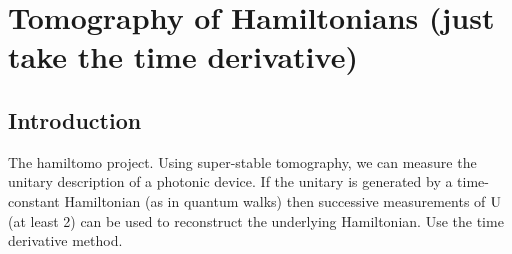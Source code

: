 \chapter{Tomography of Hamiltonians (just take the time derivative)}
\label{ch:Hamiltomo}

\section{Introduction}
The hamiltomo project. Using super-stable tomography, we can measure the unitary
description of a photonic device. If the unitary is generated by a time-constant
Hamiltonian (as in quantum walks) then successive measurements of \(\mathrm{U}\)
(at least 2) can be used to reconstruct the underlying Hamiltonian. Use the time
derivative method.
